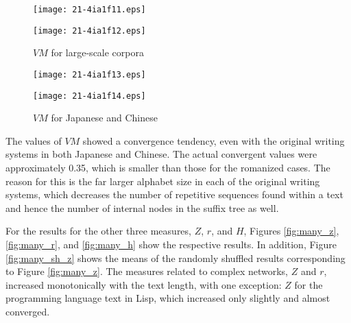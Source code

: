 \documentclass[english]{jnlp_1.4_rep}
\begin{document}
\begin{figure}[b]
\setlength{\captionwidth}{0.49\hsize}
\begin{minipage}[t]{0.49\hsize}
\begin{center}
\texttt{[image: 21-4ia1f11.eps]}
\end{center}
\caption{$\mathit{VM}$ for large-scale corpora }
\label{fig:many_v}
\end{minipage}
\hfill
\begin{minipage}[t]{0.49\hsize}
\begin{center}
\texttt{[image: 21-4ia1f12.eps]}
\end{center}
\label{fig:many_v2}
\end{minipage}
\end{figure}
\begin{figure}[b]
\setlength{\captionwidth}{0.49\hsize}
\begin{minipage}[t]{0.49\hsize}
\begin{center}
\texttt{[image: 21-4ia1f13.eps]}
\end{center}
\caption{$\mathit{VM}$ for Japanese and Chinese }
\label{fig:raw_v}
\end{minipage}
\hfill
\begin{minipage}[t]{0.49\hsize}
\begin{center}
\texttt{[image: 21-4ia1f14.eps]}
\end{center}
\label{fig:raw_v2}
\end{minipage}
\end{figure}

The values of $\mathit{VM}$ showed a convergence tendency, even with the 
original writing systems in both Japanese and Chinese. The actual convergent 
values were approximately 0.35, which is smaller than those for the romanized cases. The reason for this is the far larger alphabet size in each of the original writing systems, which decreases the number of repetitive sequences found within a text and hence the number of internal nodes in the suffix tree as well. 

For the results for the other three measures, $Z$, $r$, and $H$, 
Figures \ref{fig:many_z}, \ref{fig:many_r}, and \ref{fig:many_h} show 
the respective results. In addition, Figure \ref{fig:many_sh_z} shows the 
means of the randomly shuffled results corresponding to Figure \ref{fig:many_z}. 
The measures related to complex networks, $Z$ and $r$, increased monotonically with the text length, with one exception: $Z$ for the programming language text in Lisp, which increased only slightly and almost converged.
\end{document}
